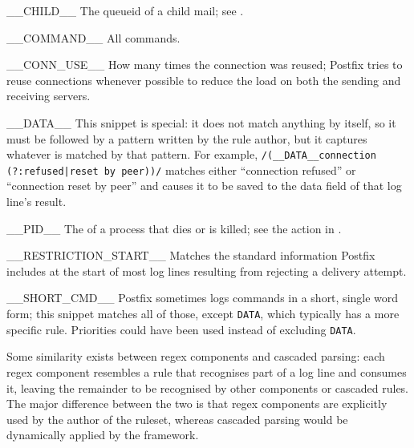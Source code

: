 \begin{eqlist}

    \squeezeitems{}

    \item [\_\_CHILD\_\_]  The queueid of a child mail; see
        .

    \item [\_\_COMMAND\_\_]  All  commands.

    \item [\_\_CONN\_USE\_\_]  How many times the connection was reused;
        Postfix tries to reuse connections whenever possible to reduce the
        load on both the sending and receiving servers.

    \item [\_\_DATA\_\_]  This snippet is special: it does not match
        anything by itself, so it must be followed by a pattern written by
        the rule author, but it captures whatever is matched by that
        pattern.  For example, \verb!/(__DATA__connection! \newline{}
        \tab{}\verb!(?:refused|reset by peer))/! matches either
        ``connection refused'' or ``connection reset by peer'' and causes
        it to be saved to the data field of that log line's result.

    \item [\_\_PID\_\_]  The  of a  process that
        dies or is killed; see the  action in
        .

    \item [\_\_RESTRICTION\_START\_\_]  Matches the standard information
        Postfix includes at the start of most log lines resulting from
        rejecting a delivery attempt.

    \item [\_\_SHORT\_CMD\_\_]  Postfix sometimes logs 
        commands in a short, single word form; this snippet matches all of
        those, except \texttt{DATA}, which typically has a more specific
        rule.  Priorities could have been used instead of excluding
        \texttt{DATA}.


\end{eqlist}

Some similarity exists between regex components and cascaded parsing: each
regex component resembles a rule that recognises part of a log line and
consumes it, leaving the remainder to be recognised by other components or
cascaded rules.  The major difference between the two is that regex
components are explicitly used by the author of the ruleset, whereas
cascaded parsing would be dynamically applied by the framework.

